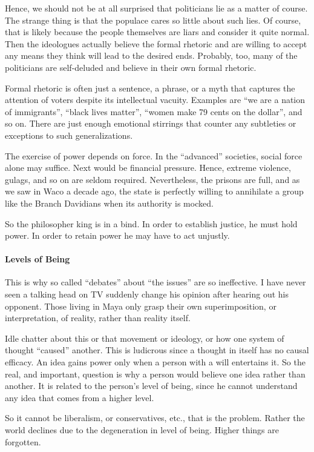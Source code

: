 Hence, we should not be at all surprised that politicians lie as a matter of course. The strange thing is that the populace cares so little about such lies. Of course, that is likely because the people themselves are liars and consider it quite normal. Then the ideologues actually believe the formal rhetoric and are willing to accept any means they think will lead to the desired ends. Probably, too, many of the politicians are self-deluded and believe in their own formal rhetoric.

Formal rhetoric is often just a sentence, a phrase, or a myth that captures the attention of voters despite its intellectual vacuity. Examples are ``we are a nation of immigrants'', ``black lives matter'', ``women make 79 cents on the dollar'', and so on. There are just enough emotional stirrings that counter any subtleties or exceptions to such generalizations.

The exercise of power depends on force. In the ``advanced'' societies, social force alone may suffice. Next would be financial pressure. Hence, extreme violence, gulags, and so on are seldom required. Nevertheless, the prisons are full, and as we saw in Waco a decade ago, the state is perfectly willing to annihilate a group like the Branch Davidians when its authority is mocked.

So the philosopher king is in a bind. In order to establish justice, he must hold power. In order to retain power he may have to act unjustly.

\paragraph{Levels of Being}


This is why so called ``debates'' about ``the issues'' are so ineffective. I have never seen a talking head on TV suddenly change his opinion after hearing out his opponent. Those living in Maya only grasp their own superimposition, or interpretation, of reality, rather than reality itself.

Idle chatter about this or that movement or ideology, or how one system of thought ``caused'' another. This is ludicrous since a thought in itself has no causal efficacy. An idea gains power only when a person with a will entertains it. So the real, and important, question is why a person would believe one idea rather than another. It is related to the person's level of being, since he cannot understand any idea that comes from a higher level.

So it cannot be liberalism, or conservatives, etc., that is the problem. Rather the world declines due to the degeneration in level of being. Higher things are forgotten.

